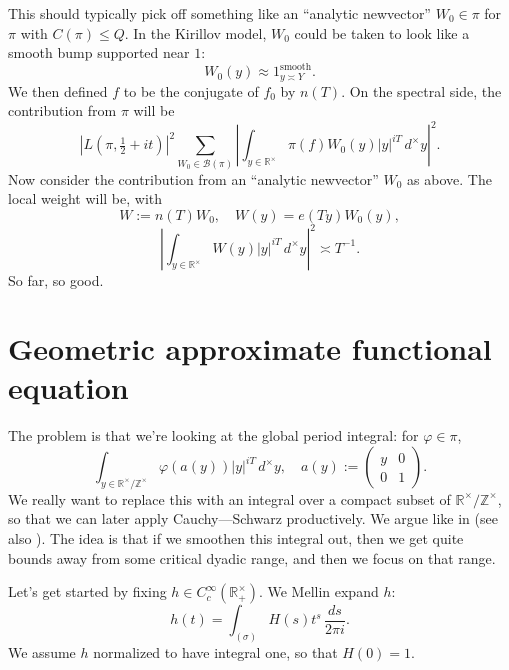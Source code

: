 \documentclass[reqno]{amsart} 
\begin{document}
This should typically pick off something like an ``analytic newvector'' $W_0 \in \pi$ for $\pi$ with $C(\pi) \leq Q$.  In the Kirillov model, $W_0$ could be taken to look like a smooth bump supported near $1$:
\begin{equation*}
  W_0(y) \approx 1_{y \asymp Y}^{\text{smooth}}.
\end{equation*}
We then defined $f$ to be the conjugate of $f_0$ by $n(T)$.  On the spectral side, the contribution from $\pi$ will be
\begin{equation*}
  \left\lvert L(\pi, \tfrac{1}{2} + i t) \right\rvert^2
  \sum _{W_0 \in \mathcal{B}(\pi)} 
  \left\lvert
    \int _{y \in \mathbb{R} ^\times }
    \pi(f) W_0(y)
    |y|^{i T}
    \, d^\times y
  \right\rvert^2.
\end{equation*}
Now consider the contribution from an ``analytic newvector'' $W_0$ as above.  The local weight will be, with
\begin{equation*}
  W := n(T) W_0, \quad W(y) = e(T y) W_0(y),
\end{equation*}
\begin{equation*}
  \left\lvert \int _{y \in \mathbb{R}^\times } W (y) |y|^{i T} \, d^\times y \right\rvert^2 \asymp T^{-1}.
\end{equation*}
So far, so good.

\section{Geometric approximate functional equation}\label{sec:20230522180027}
The problem is that we're looking at the global period integral: for $\varphi \in \pi$,
\begin{equation*}
  \int _{y \in \mathbb{R}^\times / \mathbb{Z} ^\times }
  \varphi(a(y)) |y|^{i T} \, d^\times y, \quad
  a(y) :=
  \begin{pmatrix}
    y & 0 \\
    0 & 1
  \end{pmatrix}.
\end{equation*}
We really want to replace this with an integral over a compact subset of $\mathbb{R}^\times / \mathbb{Z}^\times$, so that we can later apply Cauchy---Schwarz productively.  We argue like in \cite[\S5.1.4]{michel-2009} (see also \cite[\S5.3]{2021arXiv210915230N}).  The idea is that if we smoothen this integral out, then we get quite bounds away from some critical dyadic range, and then we focus on that range.

Let's get started by fixing $h \in C_c^\infty(\mathbb{R}^\times_+)$.  We Mellin expand $h$:
\begin{equation*}
  h(t) = \int _{(\sigma)} H(s) t^s \, \frac{d s }{ 2 \pi i}.
\end{equation*}
We assume $h$ normalized to have integral one, so that $H(0) = 1$.
\end{document}

